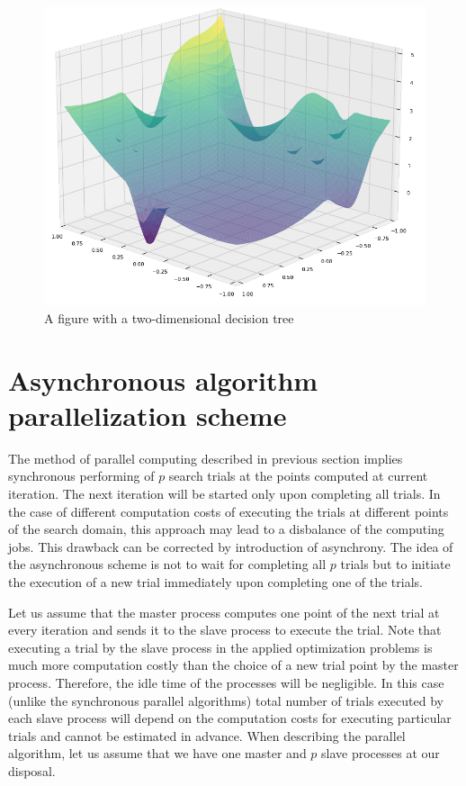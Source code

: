 \documentclass{svproc}
\begin{document}
\begin{figure}[ht!]
	\begin{center}
		\begin{minipage}[h]{0.9\linewidth}
			\includegraphics[width=1\linewidth]{figure/fig5.png}
			\caption{A figure with a two-dimensional decision tree} %
			\label{fig:fig2_2}
		\end{minipage}
	\end{center}
\end{figure}	



\section{Asynchronous algorithm parallelization scheme}\label{SecASP}

The method of parallel computing described in  previous section implies synchronous  performing of $p$ search trials at the points computed at current iteration. The next iteration will be  started only upon completing all trials. In the case of different computation costs of executing the trials at different points of the search  domain, this approach may lead to a disbalance of the computing jobs.  This drawback can be corrected by introduction of asynchrony. The idea of the asynchronous scheme is not to wait for completing all $p$ trials but to initiate the  execution of a new trial immediately upon completing one of the trials. 

Let us assume that the master process computes one point of the next trial at every iteration and sends  it to the slave process to execute the trial. Note that executing a trial by the slave process in  the applied optimization problems is much more computation costly than the choice of a new trial point  by the master process. Therefore, the idle time of the processes will be negligible. In this  case (unlike the synchronous parallel algorithms) total number of trials executed by each slave  process will depend on the computation costs for executing particular trials and cannot be estimated in  advance. When describing the parallel algorithm, let us assume that we have one master and $p$ slave processes at our disposal.
\end{document}
